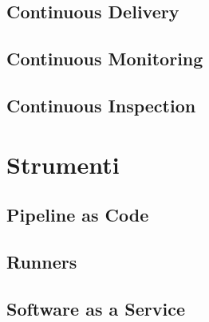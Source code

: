 \subsection{Continuous Delivery}

\subsection{Continuous Monitoring}

\subsection{Continuous Inspection}

\section{Strumenti}
\subsection{Pipeline as Code}

\subsection{Runners}

\subsection{Software as a Service}
